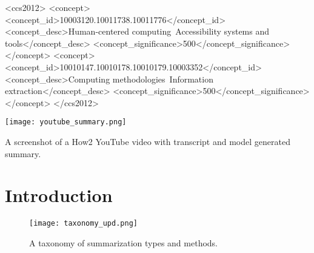 \documentclass[sigconf]{acmart}
\begin{document}
\begin{CCSXML}
<ccs2012>
   <concept>
       <concept_id>10003120.10011738.10011776</concept_id>
       <concept_desc>Human-centered computing~Accessibility systems and tools</concept_desc>
       <concept_significance>500</concept_significance>
       </concept>
   <concept>
       <concept_id>10010147.10010178.10010179.10003352</concept_id>
       <concept_desc>Computing methodologies~Information extraction</concept_desc>
       <concept_significance>500</concept_significance>
       </concept>
 </ccs2012>
\end{CCSXML}



\begin{teaserfigure}
  \texttt{[image: youtube\_summary.png]}
  \caption{A screenshot of a How2 YouTube video with transcript and model generated summary.}
  \label{fig:teaser}
\end{teaserfigure}

\maketitle
\section{Introduction}

\begin{figure*}
\centering
  \texttt{[image: taxonomy\_upd.png]}
  \caption{A taxonomy of summarization types and methods.}
  \label{fig:taxonomy}
\end{figure*}
\end{document}
